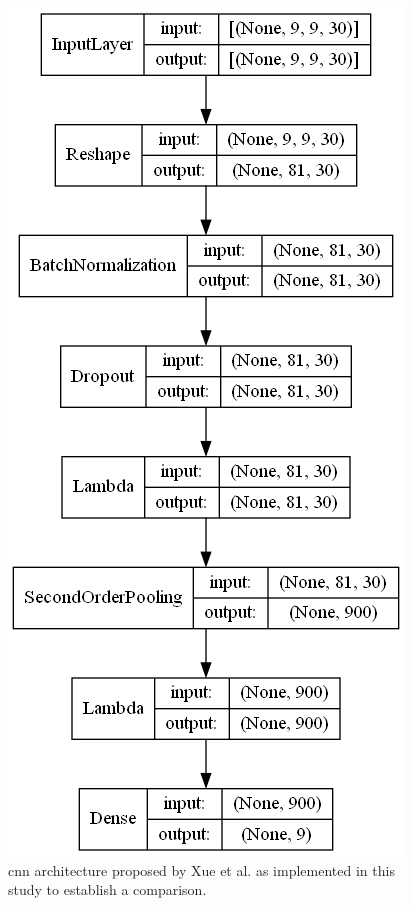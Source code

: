 \begin{figure}[ht]
    \centering
    \includegraphics[width=.7\linewidth]{figs/vineyard_classification/networks/aspn_9x8_32.png}
	\caption{\acrshort{cnn} architecture proposed by Xue et al. \cite{xue_attention-based_2021} as implemented in this study to establish a comparison. }
	\label{fig:aspn_cnn}
\end{figure}

